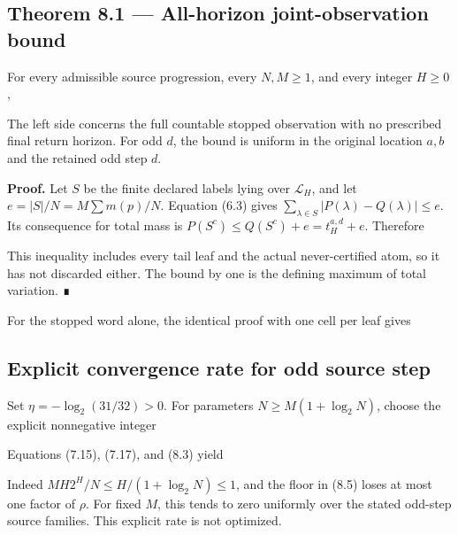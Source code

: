 \subsection{Theorem 8.1 --- All-horizon joint-observation bound}

For every admissible source progression, every \(N,M\ge1\), and every
integer \(H\ge0\),


The left side concerns the full countable stopped observation with no
prescribed final return horizon. For odd \(d\), the bound is uniform in
the original location \(a,b\) and the retained odd step \(d\).

\textbf{Proof.} Let \(S\) be the finite declared labels lying over
\(\mathcal L_H\), and let \(e=|S|/N=M\sum m(p)/N\). Equation (6.3) gives
\(\sum_{\lambda\in S}|P(\lambda)-Q(\lambda)|\le e\). Its consequence for
total mass is \(P(S^c)\le Q(S^c)+e=t_H^{a,d}+e\). Therefore


This inequality includes every tail leaf and the actual never-certified
atom, so it has not discarded either. The bound by one is the defining
maximum of total variation. ∎

For the stopped word alone, the identical proof with one cell per leaf
gives


\subsection{Explicit convergence rate for odd source step}

Set \(\eta=-\log_2(31/32)>0\). For parameters \(N\ge M(1+\log_2N)\),
choose the explicit nonnegative integer


Equations (7.15), (7.17), and (8.3) yield


Indeed \(M H2^H/N\le H/(1+\log_2N)\le1\), and the floor in (8.5) loses
at most one factor of \(\rho\). For fixed \(M\), this tends to zero
uniformly over the stated odd-step source families. This explicit rate
is not optimized.

